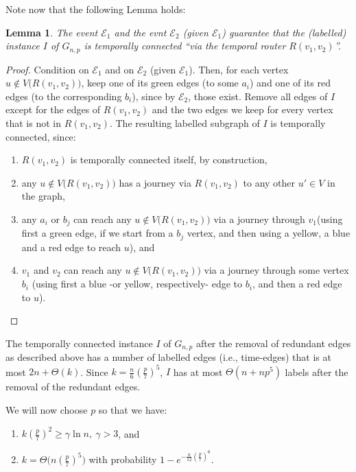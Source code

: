 \documentclass[a4paper,UKenglish]{article}
\newtheorem{lemma}{Lemma}
\begin{document}
Note now that the following Lemma holds:
\begin{lemma}
The event $\mathcal{E}_1$ and the evnt $\mathcal{E}_2$ (given $\mathcal{E}_1$) guarantee that the (labelled) instance $I$ of $G_{n,p}$ is temporally connected ``via the temporal router $R(v_1,v_2)$''.
\end{lemma}
\begin{proof}
Condition on $\mathcal{E}_1$ and on $\mathcal{E}_2$ (given $\mathcal{E}_1$). Then, for each vertex $u\not \in V\big( R(v_1,v_2) \big)$, keep one of its green edges (to some $a_i$) and one of its red edges (to the corresponding $b_i$), since by $\mathcal{E}_2$, those exist. Remove all edges of $I$ except for the edges of $R(v_1,v_2)$ and the two edges we keep for every vertex that is not in $R(v_1,v_2)$. The resulting labelled subgraph of $I$ is temporally connected, since:
\begin{enumerate}[label=\alph*)]
\item $R(v_1,v_2)$ is temporally connected itself, by construction,
\item any $u \not \in V\big( R(v_1,v_2) \big)$ has a journey via $R(v_1,v_2)$ to any other $u' \in V$ in the graph,
\item any $a_i$ or $b_j$ can reach any $u \not \in V\big( R(v_1,v_2) \big)$ via a journey through $v_1$(using first a green edge, if we start from a $b_j$ vertex, and then using a yellow, a blue and a red edge to reach $u$), and
\item $v_1$ and $v_2$ can reach any $u \not \in V\big( R(v_1,v_2) \big)$ via a journey through some vertex $b_i$ (using first a blue -or yellow, respectively- edge to $b_i$, and then a red edge to $u$).
\end{enumerate}
\end{proof}

The temporally connected instance $I$ of $G_{n,p}$ after the removal of redundant edges as described above has a number of labelled edges (i.e., time-edges) that is at most $2n+\Theta(k)$. Since $k=\frac{n}{6} \left( \frac{p}{7}\right)^5$, $I$ has at most $\Theta(n+ n p^5)$ labels after the removal of the redundant edges.

We will now choose $p$ so that we have:
\begin{enumerate}[label=\alph*)]
\item $k \left( \frac{p}{7}\right)^2 \geq \gamma \ln{n},~\gamma >3$, and
\item $k= \Theta\big( n\left(\frac{p}{7}\right)^5 \big)$ with probability $1- e^{-\frac{n}{12} \left( \frac{p}{7} \right)^6}$.
\end{enumerate}
\end{document}
